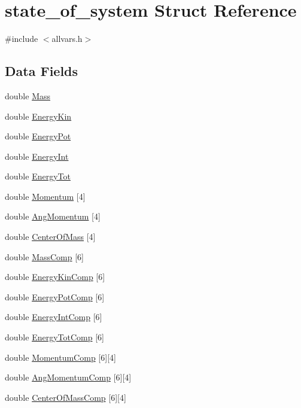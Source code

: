 \hypertarget{structstate__of__system}{
\section{state\_\-of\_\-system Struct Reference}
\label{structstate__of__system}
}


{\ttfamily \#include $<$allvars.h$>$}

\subsection*{Data Fields}
\begin{DoxyCompactItemize}
\item 
double \hyperlink{structstate__of__system_a8a3263df2542de95325b0684814dab52}{Mass}
\item 
double \hyperlink{structstate__of__system_a92ed1ad5f1a02586030b21f5f3e560ec}{EnergyKin}
\item 
double \hyperlink{structstate__of__system_aece07698cdbe00520fcb92ad9f04d435}{EnergyPot}
\item 
double \hyperlink{structstate__of__system_a8ee567f49007a65817989a252d8c4f90}{EnergyInt}
\item 
double \hyperlink{structstate__of__system_a2e6631f75e195c1b3cc446478bbdf413}{EnergyTot}
\item 
double \hyperlink{structstate__of__system_a052f3f69811197adc33ecb8c4c1f8d6e}{Momentum} \mbox{[}4\mbox{]}
\item 
double \hyperlink{structstate__of__system_a47635bc3c684637fff0c078223ae59fc}{AngMomentum} \mbox{[}4\mbox{]}
\item 
double \hyperlink{structstate__of__system_abdfe2ff074685ef9fdc4043beb898e98}{CenterOfMass} \mbox{[}4\mbox{]}
\item 
double \hyperlink{structstate__of__system_a760dbd458028ff092d8fab04f54f90ff}{MassComp} \mbox{[}6\mbox{]}
\item 
double \hyperlink{structstate__of__system_a8b776a503b441fc690c0940e3386a2fb}{EnergyKinComp} \mbox{[}6\mbox{]}
\item 
double \hyperlink{structstate__of__system_af495e90a93989d10e7f138c33c5cdad3}{EnergyPotComp} \mbox{[}6\mbox{]}
\item 
double \hyperlink{structstate__of__system_af96bea4b9655900eef6d7734629241a7}{EnergyIntComp} \mbox{[}6\mbox{]}
\item 
double \hyperlink{structstate__of__system_a2e9e012733cab8c6352b8eb23dfa4763}{EnergyTotComp} \mbox{[}6\mbox{]}
\item 
double \hyperlink{structstate__of__system_a795ecb5f9b1749847bdb2d8d275323c1}{MomentumComp} \mbox{[}6\mbox{]}\mbox{[}4\mbox{]}
\item 
double \hyperlink{structstate__of__system_a384a907f66c243418fbd02c317154c72}{AngMomentumComp} \mbox{[}6\mbox{]}\mbox{[}4\mbox{]}
\item 
double \hyperlink{structstate__of__system_a828dd437a8be308919aa25633135a902}{CenterOfMassComp} \mbox{[}6\mbox{]}\mbox{[}4\mbox{]}
\end{DoxyCompactItemize}


